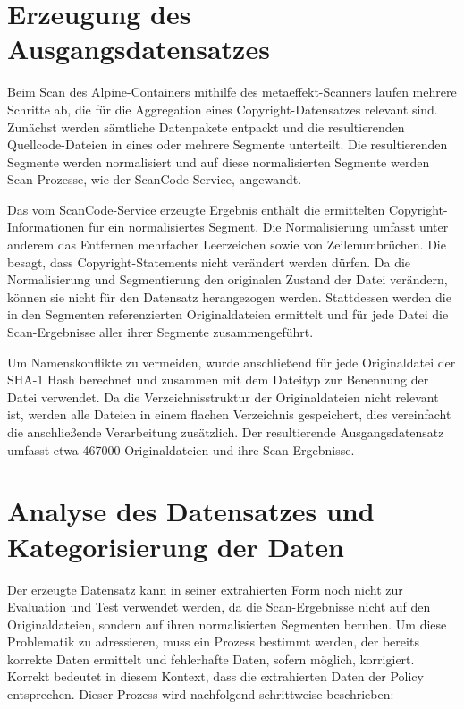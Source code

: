 \section{Erzeugung des Ausgangsdatensatzes}\label{sec:erzeugung-datensatz}

Beim Scan des Alpine-Containers mithilfe des metaeffekt-Scanners laufen mehrere Schritte ab, die für die Aggregation eines Copyright-Datensatzes relevant sind.
Zunächst werden sämtliche Datenpakete entpackt und die resultierenden Quellcode-Dateien in eines oder mehrere Segmente unterteilt.
Die resultierenden Segmente werden normalisiert und auf diese normalisierten Segmente werden Scan-Prozesse, wie der ScanCode-Service, angewandt.

Das vom ScanCode-Service erzeugte Ergebnis enthält die ermittelten Copyright-Informationen für ein normalisiertes Segment.
Die Normalisierung umfasst unter anderem das Entfernen mehrfacher Leerzeichen sowie von Zeilenumbrüchen.
Die  besagt, dass Copyright-Statements nicht verändert werden dürfen.
Da die Normalisierung und Segmentierung den originalen Zustand der Datei verändern, können sie nicht für den Datensatz herangezogen werden.
Stattdessen werden die in den Segmenten referenzierten Originaldateien ermittelt und für jede Datei die Scan-Ergebnisse aller ihrer Segmente zusammengeführt.

Um Namenskonflikte zu vermeiden, wurde anschließend für jede Originaldatei der SHA-1 Hash berechnet und zusammen mit dem Dateityp zur Benennung der Datei verwendet.
Da die Verzeichnisstruktur der Originaldateien nicht relevant ist, werden alle Dateien in einem flachen Verzeichnis gespeichert, dies vereinfacht die anschließende Verarbeitung zusätzlich.
Der resultierende Ausgangsdatensatz umfasst etwa \num{467000} Originaldateien und ihre Scan-Ergebnisse.


\section{Analyse des Datensatzes und Kategorisierung der Daten}\label{sec:analyse-datensatz}

Der erzeugte Datensatz kann in seiner extrahierten Form noch nicht zur Evaluation und Test verwendet werden, da die Scan-Ergebnisse nicht auf den Originaldateien, sondern auf ihren normalisierten Segmenten beruhen.
Um diese Problematik zu adressieren, muss ein Prozess bestimmt werden, der bereits korrekte Daten ermittelt und fehlerhafte Daten, sofern möglich, korrigiert.
Korrekt bedeutet in diesem Kontext, dass die extrahierten Daten der Policy entsprechen.
Dieser Prozess wird nachfolgend schrittweise beschrieben:

